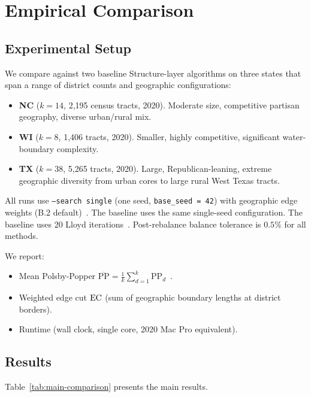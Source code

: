 \section{Empirical Comparison}
\label{sec:comparison}

\subsection{Experimental Setup}

We compare \bfsg{} against two baseline Structure-layer algorithms on
three states that span a range of district counts and geographic configurations:

\begin{itemize}
\item \textbf{NC} ($k=14$, 2{,}195 census tracts, 2020).
  Moderate size, competitive partisan geography, diverse urban/rural mix.
\item \textbf{WI} ($k=8$, 1{,}406 tracts, 2020).
  Smaller, highly competitive, significant water-boundary complexity.
\item \textbf{TX} ($k=38$, 5{,}265 tracts, 2020).
  Large, Republican-leaning, extreme geographic diversity from urban cores
  to large rural West Texas tracts.
\end{itemize}

All runs use \texttt{--search single} (one seed, \texttt{base\_seed = 42})
with geographic edge weights (B.2 default)~\citep{b2paper}.
The \metis{} baseline uses the same single-seed configuration.
The \cvd{} baseline uses 20 Lloyd iterations~\citep{b22paper}.
Post-rebalance balance tolerance is $0.5\%$ for all methods.

We report:
\begin{itemize}
\item Mean Polsby-Popper $\overline{\mathrm{PP}} = \frac{1}{k} \sum_{d=1}^k \mathrm{PP}_d$~\citep{polsby1991}.
\item Weighted edge cut $\mathrm{EC}$ (sum of geographic boundary lengths at district borders).
\item Runtime (wall clock, single core, 2020 Mac Pro equivalent).
\end{itemize}

\subsection{Results}

Table~\ref{tab:main-comparison} presents the main results.

